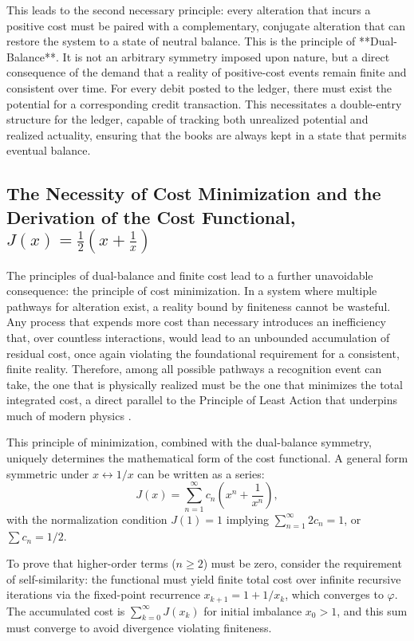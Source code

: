 This leads to the second necessary principle: every alteration that incurs a positive cost must be paired with a complementary, conjugate alteration that can restore the system to a state of neutral balance. This is the principle of **Dual-Balance**. It is not an arbitrary symmetry imposed upon nature, but a direct consequence of the demand that a reality of positive-cost events remain finite and consistent over time. For every debit posted to the ledger, there must exist the potential for a corresponding credit transaction. This necessitates a double-entry structure for the ledger, capable of tracking both unrealized potential and realized actuality, ensuring that the books are always kept in a state that permits eventual balance.

\subsection{The Necessity of Cost Minimization and the Derivation of the Cost Functional, \texorpdfstring{$J(x) = \frac{1}{2}(x + \frac{1}{x})$}{J(x) = 1/2(x + 1/x)}}

The principles of dual-balance and finite cost lead to a further unavoidable consequence: the principle of cost minimization. In a system where multiple pathways for alteration exist, a reality bound by finiteness cannot be wasteful. Any process that expends more cost than necessary introduces an inefficiency that, over countless interactions, would lead to an unbounded accumulation of residual cost, once again violating the foundational requirement for a consistent, finite reality. Therefore, among all possible pathways a recognition event can take, the one that is physically realized must be the one that minimizes the total integrated cost, a direct parallel to the Principle of Least Action that underpins much of modern physics \parencite{Landau1976}.

This principle of minimization, combined with the dual-balance symmetry, uniquely determines the mathematical form of the cost functional. A general form symmetric under \(x \leftrightarrow 1/x\) can be written as a series:
\begin{equation}
J(x) = \sum_{n=1}^{\infty} c_n \left( x^n + \frac{1}{x^n} \right),
\end{equation}
with the normalization condition \(J(1)=1\) implying \(\sum_{n=1}^{\infty} 2c_n = 1\), or \(\sum c_n = 1/2\).

To prove that higher-order terms (\(n \geq 2\)) must be zero, consider the requirement of self-similarity: the functional must yield finite total cost over infinite recursive iterations via the fixed-point recurrence \(x_{k+1} = 1 + 1/x_k\), which converges to \(\varphi\). The accumulated cost is \(\sum_{k=0}^{\infty} J(x_k)\) for initial imbalance \(x_0 > 1\), and this sum must converge to avoid divergence violating finiteness.

